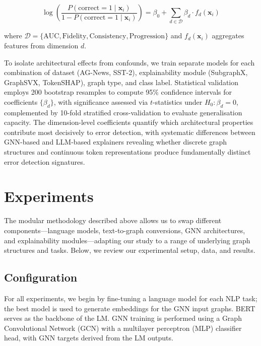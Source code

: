 \documentclass[preprint, times, review, 10pt]{elsarticle}
\begin{document}
\begin{equation}
\log\left(\frac{P(\text{correct} = 1 \mid \mathbf{x}_i)}{1 - P(\text{correct} = 1 \mid \mathbf{x}_i)}\right) = \beta_0 + \sum_{d \in \mathcal{D}} \beta_d \cdot f_d(\mathbf{x}_i)
\end{equation}

where \(\mathcal{D} = \{\text{AUC}, \text{Fidelity}, \text{Consistency}, \text{Progression}\}\) and \(f_d(\mathbf{x}_i)\) aggregates features from dimension \(d\).

To isolate architectural effects from confounds, we train separate models for each combination of dataset (AG-News, SST-2), explainability module (SubgraphX, GraphSVX, TokenSHAP), graph type, and class label. Statistical validation employs 200 bootstrap resamples to compute 95\% confidence intervals for coefficients \(\{\beta_d\}\), with significance assessed via \(t\)-statistics under \(H_0: \beta_d = 0\), complemented by 10-fold stratified cross-validation to evaluate generalisation capacity. The dimension-level coefficients quantify which architectural properties contribute most decisively to error detection, with systematic differences between GNN-based and LLM-based explainers revealing whether discrete graph structures and continuous token representations produce fundamentally distinct error detection signatures.





\section{Experiments} \label{experiments}

The modular methodology described above allows us to swap different components—language models, text-to-graph conversions, GNN architectures, and explainability modules—adapting our study to a range of underlying graph structures and tasks. Below, we review our experimental setup, data, and results.






\subsection{Configuration} \label{configuration}

For all experiments, we begin by fine-tuning a language model for each NLP task; the best model is used to generate embeddings for the GNN input graphs. BERT serves as the backbone of the LM. GNN training is performed using a Graph Convolutional Network (GCN) with a multilayer perceptron (MLP) classifier head, with GNN targets derived from the LM outputs.
\end{document}
